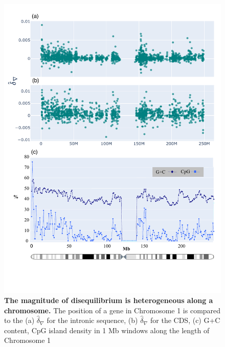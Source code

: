 \begin{figure}[htbp]
\centering
\includegraphics[width=\textwidth]{figures/plots/primate/nabla_CpG_appendix.pdf}
\caption[The magnitude of disequilibrium is heterogeneous along a chromosome]{\textbf{The magnitude of disequilibrium is heterogeneous along a chromosome.} The position of a gene in Chromosome 1 is compared to the (a) $\hat\delta_\nabla$ for the intronic sequence, (b) $\hat\delta_\nabla$ for the CDS, (c) G+C content, CpG island density in 1 Mb windows along the length of Chromosome 1 \citep[adapted from Supplementary Figure 1b]{Gregory2006TheChromosome11}}
\label{fig:primate:dconv-manhattan-appendix}
\end{figure}
